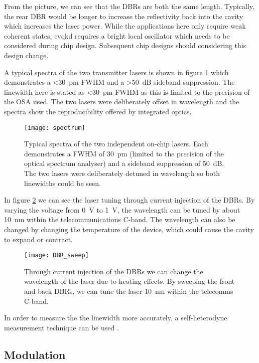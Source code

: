 From the picture, we can see that the \acp{DBR} are both the same length. Typically, the rear \ac{DBR} would be longer to increase the reflectivity back into the cavity which increases the laser power. While the applications here only require weak coherent states, \ac{cvqkd} requires a bright local oscillator which needs to be considered during chip design. Subsequent chip designs should considering this design change.

A typical spectra of the two transmitter lasers is shown in figure \ref{fig:spectra} which demonstrates a \SI{<30}{pm} \ac{FWHM} and a \SI{>50}{dB} sideband suppression. The linewidth here is stated as \SI{<30}{pm} \ac{FWHM} as this is limited to the precision of the \ac{OSA} used. The two lasers were deliberately offset in wavelength and the spectra show the reproducibility offered by integrated optics.

\begin{figure}[tbp]
	\centering
	\texttt{[image: spectrum]}
	\caption[Laser spectrum]{Typical spectra of the two independent on-chip lasers. Each demonstrates a \ac{FWHM} of \SI{30}{pm} (limited to the precision of the optical spectrum analyser) and a sideband suppression of \SI{50}{dB}. The two lasers were deliberately detuned in wavelength so both linewidths could be seen.}
	\label{fig:spectra}
\end{figure}

In figure \ref{fig:DBR_sweep} we can see the laser tuning through current injection of the \acp{DBR}. By varying the voltage from \SI{0}{\V} to \SI{1}{\V}, the wavelength can be tuned by about \SI{10}{\nm} within the telecommunications C-band. The wavelength can also be changed by changing the temperature of the device, which could cause the cavity to expand or contract. 

\begin{figure}[tbp]
	\centering
	\texttt{[image: DBR\_sweep]}
	\caption[Laser wavelength scan with DBR current injection]{Through current injection of the \acp{DBR} we can change the wavelength of the laser due to heating effects. By sweeping the front and back \acp{DBR}, we can tune the laser \SI{10}{\nm} within the telecomms C-band.}
	\label{fig:DBR_sweep}
\end{figure}

In order to measure the the linewidth more accurately, a self-heterodyne measurement technique can be used \cite{self-heterodyne}. 

\subsection{Modulation}

